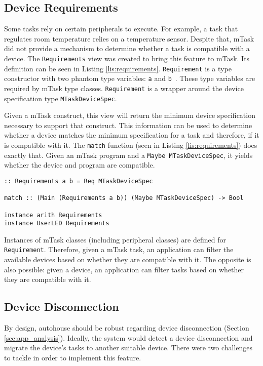 \subsection{Device Requirements}

Some tasks rely on certain peripherals to execute. For example, a task that regulates room temperature relies on a temperature sensor. Despite that, \gls{mTask} did not provide a mechanism to determine whether a task is compatible with a device. The \texttt{Requirements} view was created to bring this feature to \gls{mTask}. Its definition can be seen in Listing \ref{lis:requirements}. \texttt{Requirement} is a type constructor with two phantom type variables: \texttt{a} and \texttt{b}~\cite{phantom}. These type variables are required by \gls{mTask} type classes. \texttt{Requirement} is a wrapper around the device specification type \texttt{MTaskDeviceSpec}. 

Given a \gls{mTask} construct, this view will return the minimum device specification necessary to support that construct. This information can be used to determine whether a device matches the minimum specification for a task and therefore, if it is compatible with it. The \texttt{match} function (seen in Listing \ref{lis:requirements}) does exactly that. Given an \gls{mTask} program and a \texttt{Maybe MTaskDeviceSpec}, it yields whether the device and program are compatible.

\begin{lstlisting}[caption=The \texttt{Requirements} view,captionpos=b,label=lis:requirements]
:: Requirements a b = Req MTaskDeviceSpec

match :: (Main (Requirements a b)) (Maybe MTaskDeviceSpec) -> Bool

instance arith Requirements
instance UserLED Requirements 
\end{lstlisting}

Instances of \gls{mTask} classes (including peripheral classes) are defined for \texttt{Requirement}. Therefore, given a \gls{mTask} task, an application can filter the available devices based on whether they are compatible with it. The opposite is also possible: given a device, an application can filter tasks based on whether they are compatible with it.

\subsection{Device Disconnection}

By design, \gls{autohouse} should be robust regarding device disconnection (Section \ref{sec:app_analysis}). Ideally, the system would detect a device disconnection and migrate the device's tasks to another suitable device. There were two challenges to tackle in order to implement this feature. 

